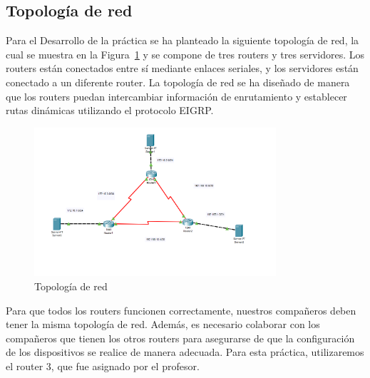     \subsection{Topología de red}
        Para el Desarrollo de la práctica se ha planteado la siguiente topología de red, la cual se muestra en la Figura~\ref{fig:topologia} y se compone de tres routers y tres servidores. Los routers están conectados entre sí mediante enlaces seriales, y los servidores están conectado a un diferente router. La topología de red se ha diseñado de manera que los routers puedan intercambiar información de enrutamiento y establecer rutas dinámicas utilizando el protocolo EIGRP.
    \begin{figure}[H]
        \centering
        \includegraphics[width=0.8\textwidth]{img/Topologia.png}
        \caption{Topología de red}
        \label{fig:topologia}
    \end{figure}

    Para que todos los routers funcionen correctamente, nuestros compañeros deben tener la misma topología de red. Además, es necesario colaborar con los compañeros que tienen los otros routers para asegurarse de que la configuración de los dispositivos se realice de manera adecuada. Para esta práctica, utilizaremos el router 3, que fue asignado por el profesor.
    
